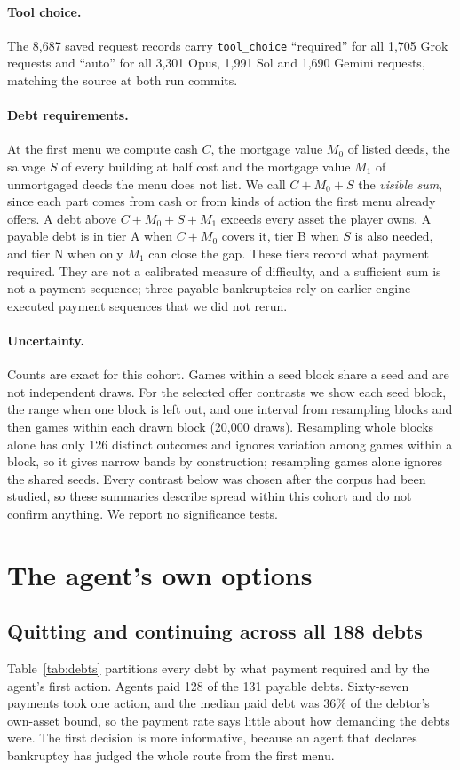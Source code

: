 \documentclass[11pt,letterpaper]{article}
\begin{document}
\paragraph{Tool choice.} The 8,687 saved request records carry \texttt{tool\_choice} ``required'' for all 1,705 Grok requests and ``auto'' for all 3,301 Opus, 1,991 Sol and 1,690 Gemini requests, matching the source at both run commits.

\paragraph{Debt requirements.} At the first menu we compute cash $C$, the mortgage value $M_0$ of listed deeds, the salvage $S$ of every building at half cost and the mortgage value $M_1$ of unmortgaged deeds the menu does not list. We call $C+M_0+S$ the \emph{visible sum}, since each part comes from cash or from kinds of action the first menu already offers. A debt above $C+M_0+S+M_1$ exceeds every asset the player owns. A payable debt is in tier A when $C+M_0$ covers it, tier B when $S$ is also needed, and tier N when only $M_1$ can close the gap. These tiers record what payment required. They are not a calibrated measure of difficulty, and a sufficient sum is not a payment sequence; three payable bankruptcies rely on earlier engine-executed payment sequences that we did not rerun.

\paragraph{Uncertainty.} Counts are exact for this cohort. Games within a seed block share a seed and are not independent draws. For the selected offer contrasts we show each seed block, the range when one block is left out, and one interval from resampling blocks and then games within each drawn block (20,000 draws). Resampling whole blocks alone has only 126 distinct outcomes and ignores variation among games within a block, so it gives narrow bands by construction; resampling games alone ignores the shared seeds. Every contrast below was chosen after the corpus had been studied, so these summaries describe spread within this cohort and do not confirm anything. We report no significance tests.

\section{The agent's own options}

\subsection{Quitting and continuing across all 188 debts}
Table~\ref{tab:debts} partitions every debt by what payment required and by the agent's first action. Agents paid 128 of the 131 payable debts. Sixty-seven payments took one action, and the median paid debt was 36\% of the debtor's own-asset bound, so the payment rate says little about how demanding the debts were. The first decision is more informative, because an agent that declares bankruptcy has judged the whole route from the first menu.
\end{document}
